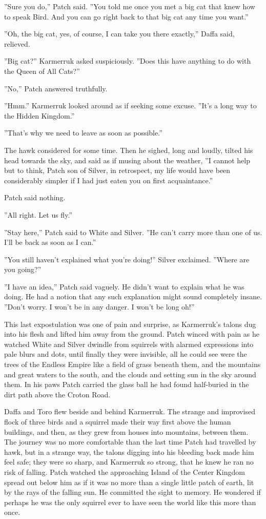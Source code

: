 \documentclass[12pt]{book}
\begin{document}
 ''Sure you do,'' Patch said. ''You told me once you met a big cat that knew how to speak Bird. And you can go right back to that big cat any time you want.''\par
 ''Oh, the big cat, yes, of course, I can take you there exactly,'' Daffa said, relieved.\par
 ''Big cat?'' Karmerruk asked suspiciously. ''Does this have anything to do with the Queen of All Cats?''\par
 ''No,'' Patch answered truthfully.\par
 ''Hmm.'' Karmerruk looked around as if seeking some excuse. ''It's a long way to the Hidden Kingdom.''\par
 ''That's why we need to leave as soon as possible.''\par
 The hawk considered for some time. Then he sighed, long and loudly, tilted his head towards the sky, and said as if musing about the weather, ''I cannot help but to think, Patch son of Silver, in retrospect, my life would have been considerably simpler if I had just eaten you on first acquaintance.''\par
 Patch said nothing.\par
 ''All right. Let us fly.''\par
 ''Stay here,'' Patch said to White and Silver. ''He can't carry more than one of us. I'll be back as soon as I can.''\par
 ''You still haven't explained what you're doing!'' Silver exclaimed. ''Where are you going?''\par
 ''I have an idea,'' Patch said vaguely. He didn't want to explain what he was doing. He had a notion that any such explanation might sound completely insane. ''Don't worry. I won't be in any danger. I won't be long %
 oh!''\par
 This last expostulation was one of pain and surprise, as Karmerruk's talons dug into his flesh and lifted him away from the ground. Patch winced with pain as he watched White and Silver dwindle from squirrels with alarmed expressions into pale blurs and dots, until finally they were invisible, all he could see were the trees of the Endless Empire like a field of grass beneath them, and the mountains and great waters to the south, and the clouds and setting sun in the sky around them. In his paws Patch carried the glass ball he had found half-buried in the dirt path above the Croton Road.\par
Daffa and Toro flew beside and behind Karmerruk. The strange and improvised flock of three birds and a squirrel made their way first above the human buildings, and then, as they grew from houses into mountains, between them. The journey was no more comfortable than the last time Patch had travelled by hawk, but in a strange way, the talons digging into his bleeding back made him feel safe; they were so sharp, and Karmerruk so strong, that he knew he ran no risk of falling. Patch watched the approaching Island of the Center Kingdom spread out below him as if it was no more than a single little patch of earth, lit by the rays of the falling sun. He committed the sight to memory. He wondered if perhaps he was the only squirrel ever to have seen the world like this more than once.\par
\end{document}
